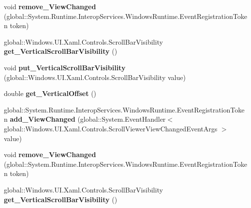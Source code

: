 \begin{DoxyCompactItemize}
void {\bfseries remove\+\_\+\+View\+Changed} (global\+::\+System.\+Runtime.\+Interop\+Services.\+Windows\+Runtime.\+Event\+Registration\+Token token)
\item 
\mbox{\label{interface_windows_1_1_u_i_1_1_xaml_1_1_controls_1_1_i_scroll_viewer_aac8cb7fc3dab5e040635188c0f681107}} 
global\+::\+Windows.\+U\+I.\+Xaml.\+Controls.\+Scroll\+Bar\+Visibility {\bfseries get\+\_\+\+Vertical\+Scroll\+Bar\+Visibility} ()
\item 
\mbox{\label{interface_windows_1_1_u_i_1_1_xaml_1_1_controls_1_1_i_scroll_viewer_a881abbaa0ee412df9ed83e36357e1086}} 
void {\bfseries put\+\_\+\+Vertical\+Scroll\+Bar\+Visibility} (global\+::\+Windows.\+U\+I.\+Xaml.\+Controls.\+Scroll\+Bar\+Visibility value)
\item 
\mbox{\label{interface_windows_1_1_u_i_1_1_xaml_1_1_controls_1_1_i_scroll_viewer_a40e7998d40517b4dcca9be65562ea770}} 
double {\bfseries get\+\_\+\+Vertical\+Offset} ()
\item 
\mbox{\label{interface_windows_1_1_u_i_1_1_xaml_1_1_controls_1_1_i_scroll_viewer_a8195e80e232dd0a3a3e52e8060f878bc}} 
global\+::\+System.\+Runtime.\+Interop\+Services.\+Windows\+Runtime.\+Event\+Registration\+Token {\bfseries add\+\_\+\+View\+Changed} (global\+::\+System.\+Event\+Handler$<$ global\+::\+Windows.\+U\+I.\+Xaml.\+Controls.\+Scroll\+Viewer\+View\+Changed\+Event\+Args $>$ value)
\item 
\mbox{\label{interface_windows_1_1_u_i_1_1_xaml_1_1_controls_1_1_i_scroll_viewer_a3176001cb06e45e61bbee6a898c4c7b3}} 
void {\bfseries remove\+\_\+\+View\+Changed} (global\+::\+System.\+Runtime.\+Interop\+Services.\+Windows\+Runtime.\+Event\+Registration\+Token token)
\item 
\mbox{\label{interface_windows_1_1_u_i_1_1_xaml_1_1_controls_1_1_i_scroll_viewer_aac8cb7fc3dab5e040635188c0f681107}} 
global\+::\+Windows.\+U\+I.\+Xaml.\+Controls.\+Scroll\+Bar\+Visibility {\bfseries get\+\_\+\+Vertical\+Scroll\+Bar\+Visibility} ()

\end{DoxyCompactItemize}

